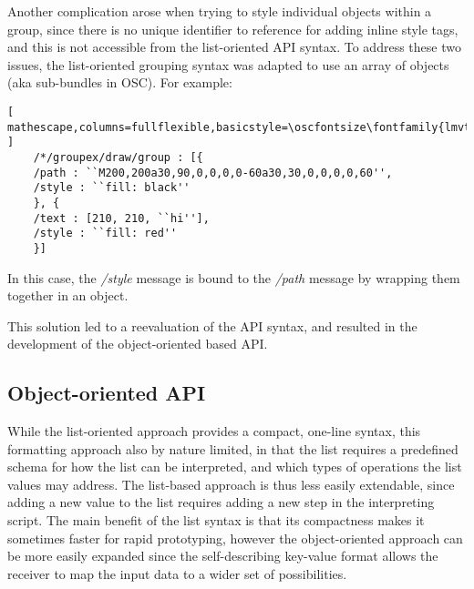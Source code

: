 Another complication arose when trying to style individual objects within a group, since there is no unique identifier to reference for adding inline style tags, and this is not accessible from the list-oriented API syntax. 
To address these two issues, the list-oriented grouping syntax was adapted to use an array of objects (aka sub-bundles in OSC). For example:
 
\begin{lstlisting}[ mathescape,columns=fullflexible,basicstyle=\oscfontsize\fontfamily{lmvtt}\selectfont ]
    /*/groupex/draw/group : [{
	/path : ``M200,200a30,90,0,0,0,0-60a30,30,0,0,0,0,60'',
	/style : ``fill: black''
    }, {
	/text : [210, 210, ``hi''],
	/style : ``fill: red''
    }]
\end{lstlisting}

\noindent
In this case, the \textit{/style} message is bound to the \textit{/path} message by wrapping them together in an object. 

This solution led to a reevaluation of the \drawsocket API syntax, and resulted in the development of the object-oriented based API.

\subsection{Object-oriented API}\label{sec:objstyle}
While the list-oriented approach provides a compact, one-line syntax, this formatting approach also by nature limited, in that the list requires a predefined schema for how the list can be interpreted, and which types of operations the list values may address. 
The list-based approach is thus less easily extendable, since adding a new value to the list requires adding a new step in the interpreting script.
The main benefit of the list syntax is that its compactness makes it sometimes faster for rapid prototyping, however the object-oriented approach can be more easily expanded since the self-describing key-value format allows the receiver to map the input data to a wider set of possibilities.

